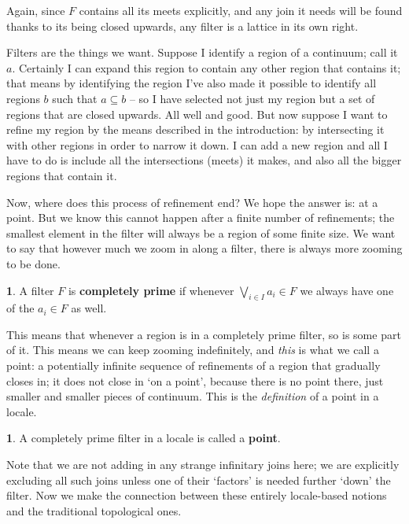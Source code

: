 \documentclass[oneside,english]{amsbook}
\numberwithin{section}{chapter}
\theoremstyle{plain}
\theoremstyle{definition}
\newtheorem{defn}[thm]{\protect\definitionname}
\providecommand{\definitionname}{Definition}
\begin{document}
Again, since $F$ contains all its meets explicitly, and any join it needs will be found thanks to its being closed upwards, any filter is a lattice in its own right.

Filters are the things we want. Suppose I identify a region of a continuum; call it $a$. Certainly I can expand this region to contain any other region that contains it; that means by identifying the region I've also made it possible to identify all regions $b$ such that $a\subseteq b$ -- so I have selected not just my region but a set of regions that are closed upwards. All well and good. But now suppose I want to refine my region by the means described in the introduction: by intersecting it with other regions in order to narrow it down. I can add a new region and all I have to do is include all the intersections (meets) it makes, and also all the bigger regions that contain it. 

Now, where does this process of refinement end? We hope the answer is: at a point. But we know this cannot happen after a finite number of refinements; the smallest element in the filter will always be a region of some finite size. We want to say that however much we zoom in along a filter, there is always more zooming to be done. 

\begin{defn} 
	A filter $F$ is \textbf{completely prime }if whenever $\bigvee_{i\in I}a_{i}\in F$ we always have one of the $a_{i}\in F$ as well. 
\end{defn} 

This means that whenever a region is in a completely prime filter, so is some part of it. This means we can keep zooming indefinitely, and \emph{this} is what we call a point: a potentially infinite sequence of refinements of a region that gradually closes in; it does not close in `on a point', because there is no point there, just smaller and smaller pieces of continuum. This is the \emph{definition} of a point in a locale. 

\begin{defn} 
	A completely prime filter in a locale is called a \textbf{point}. 
\end{defn}

Note that we are not adding in any strange infinitary joins here; we are explicitly excluding all such joins unless one of their `factors' is needed further `down' the filter. Now we make the connection between these entirely locale-based notions and the traditional topological ones.
\end{document}
